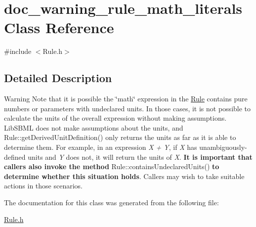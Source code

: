 \hypertarget{classdoc__warning__rule__math__literals}{}\section{doc\+\_\+warning\+\_\+rule\+\_\+math\+\_\+literals Class Reference}
\label{classdoc__warning__rule__math__literals}


{\ttfamily \#include $<$Rule.\+h$>$}



\subsection{Detailed Description}
\begin{DoxyWarning}{Warning}
Note that it is possible the \char`\"{}math\char`\"{} expression in the \hyperlink{class_rule}{Rule} contains pure numbers or parameters with undeclared units. In those cases, it is not possible to calculate the units of the overall expression without making assumptions. Lib\+S\+B\+ML does not make assumptions about the units, and Rule\+::get\+Derived\+Unit\+Definition() only returns the units as far as it is able to determine them. For example, in an expression {\itshape X + Y}, if {\itshape X} has unambiguously-\/defined units and {\itshape Y} does not, it will return the units of {\itshape X}. {\bfseries It is important that callers also invoke the method} Rule\+::contains\+Undeclared\+Units() {\bfseries to determine whether this situation holds}. Callers may wish to take suitable actions in those scenarios. 
\end{DoxyWarning}


The documentation for this class was generated from the following file\+:\begin{DoxyCompactItemize}
\item 
\hyperlink{_rule_8h}{Rule.\+h}\end{DoxyCompactItemize}
